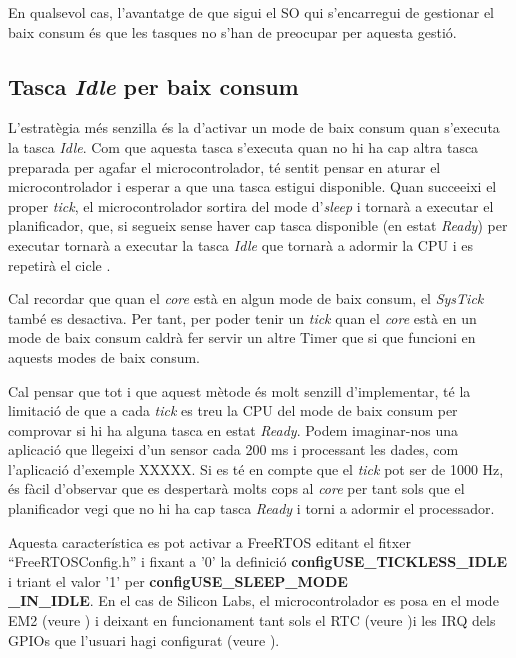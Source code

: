 En qualsevol cas, l'avantatge de que sigui el SO qui s'encarregui de gestionar el baix consum és que les tasques no s'han de preocupar per aquesta gestió.

\subsection{Tasca {\em Idle} per baix consum}
\label{sub:idlelowpower}
L'estratègia més senzilla és la d'activar un mode de baix consum quan s'executa la tasca {\em Idle}. Com que aquesta tasca s'executa quan no hi ha cap altra tasca preparada per agafar el microcontrolador, té sentit pensar en aturar el microcontrolador i esperar a que una tasca estigui disponible. Quan succeeixi el proper {\em tick}, el microcontrolador sortira del mode d'{\em sleep} i tornarà a executar el planificador, que, si segueix sense haver cap tasca disponible (en estat {\em Ready}) per executar tornarà a executar la tasca {\em Idle} que tornarà a adormir la CPU i es repetirà el cicle \cite{FreeRTOSLP}.

\begin{remark}
Cal recordar que quan el {\em core} està en algun mode de baix consum, el {\em SysTick} també es desactiva. Per tant, per poder tenir un {\em tick} quan el {\em core} està en un mode de baix consum caldrà fer servir un altre Timer que si que funcioni en aquests modes de baix consum.
\end{remark}

Cal pensar que tot i que aquest mètode és molt senzill d'implementar, té la limitació de que a cada {\em tick} es treu la CPU del mode de baix consum per comprovar si hi ha alguna tasca en estat {\em Ready}. Podem imaginar-nos una aplicació que llegeixi d'un sensor cada 200 ms i processant les dades, com l'aplicació d'exemple XXXXX. Si es té en compte que el {\em tick} pot ser de 1000 Hz, és fàcil d'observar que es despertarà molts cops al {\em core} per tant sols que el planificador vegi que no hi ha cap tasca {\em Ready} i torni a adormir el processador.

Aquesta característica es pot activar a FreeRTOS editant el fitxer ``FreeRTOSConfig.h'' i fixant a '0' la definició {\bf configUSE{\_}TICKLESS{\_}IDLE} i triant el valor '1' per {\bf configUSE\_SLEEP\_MODE\\\_IN\_IDLE}. En el cas de Silicon Labs, el microcontrolador es posa en el mode EM2 (veure ) i deixant en funcionament tant sols el RTC (veure )i les \gls{IRQ} dels GPIOs que l'usuari hagi configurat (veure ).

